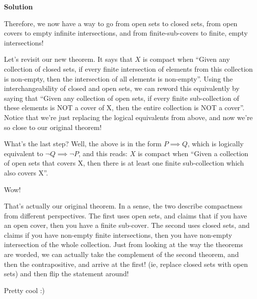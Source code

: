 \documentclass[12pt]{article}
\newcounter{AnswerCounter}
\newcounter{SubAnswerCounter}
\newenvironment{answer}[0]{
  \setcounter{SubAnswerCounter}{1}
  \bigskip
  \textbf{Solution \arabic{AnswerCounter}}
  \\
  \begin{small}
}{
  \end{small}
  \stepcounter{AnswerCounter}
}
\begin{document}
\begin{answer}[Problem 1]
Therefore, we now have a way to go from open sets to closed sets, from open covers to empty infinite intersections, and from finite-sub-covers to finite, empty intersections!

Let's revisit our new theorem. It says that $X$ is compact when ``Given any collection of closed sets, if every finite intersection of elements from this collection is non-empty, then the intersection of all elements is non-empty''. Using the interchangeability of closed and open sets, we can reword this equivalently by saying that ``Given any collection of open sets, if every finite sub-collection of these elements is NOT a cover of X, then the entire collection is NOT a cover''. Notice that we're just replacing the logical equivalents from above, and now we're so close to our original theorem!

What's the last step? Well, the above is in the form $P \implies Q$, which is logically equivalent to $\lnot Q \implies \lnot P$, and this reads: $X$ is compact when ``Given a collection of open sets that covers X, then there is at least one finite sub-collection which also covers X''.

Wow!

That's actually our original theorem. In a sense, the two describe compactness from different perspectives. The first uses open sets, and claims that if you have an open cover, then you have a finite sub-cover. The second uses closed sets, and claims if you have non-empty finite intersections, then you have non-empty intersection of the whole collection. Just from looking at the way the theorems are worded, we can actually take the complement of the second theorem, and then the contrapositive, and arrive at the first! (ie, replace closed sets with open sets) and then flip the statement around!

Pretty cool :)
\end{answer}
\end{document}

